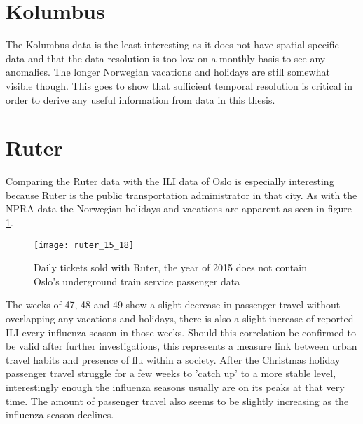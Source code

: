 \section{Kolumbus}
The Kolumbus data is the least interesting as it does not have spatial specific data and that the data resolution is too low on a monthly basis to see any anomalies. The longer Norwegian vacations and holidays are still somewhat visible though. This goes to show that sufficient temporal resolution is critical in order to derive any useful information from data in this thesis.




\section{Ruter}
Comparing the Ruter data with the ILI data of Oslo is especially interesting because Ruter is the public transportation administrator in that city. As with the NPRA data the Norwegian holidays and vacations are apparent as seen in figure \ref{fig:ruter_15_18}.

\begin{figure}[!htb]
\texttt{[image: ruter\_15\_18]}
\centering
\caption{Daily tickets sold with Ruter, the year of 2015 does not contain Oslo's underground train service passenger data}
\label{fig:ruter_15_18}
\end{figure}

The weeks of 47, 48 and 49 show a slight decrease in passenger travel without overlapping any vacations and holidays, there is also a slight increase of reported ILI every influenza season in those weeks. Should this correlation be confirmed to be valid after further investigations, this represents a measure link between urban travel habits and presence of flu within a society.
After the Christmas holiday passenger travel struggle for a few weeks to 'catch up' to a more stable level, interestingly enough the influenza seasons usually are on its peaks at that very time.
The amount of passenger travel also seems to be slightly increasing as the influenza season declines.














